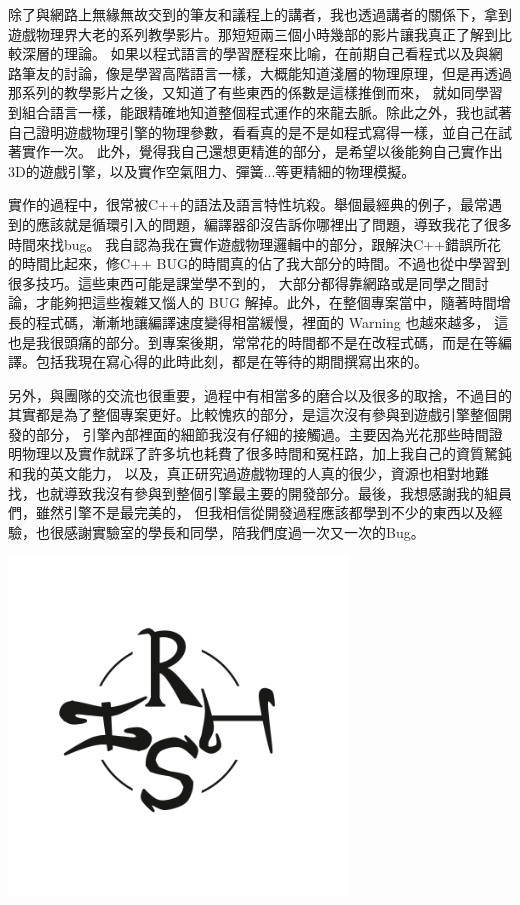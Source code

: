 除了與網路上無緣無故交到的筆友和議程上的講者，我也透過講者的關係下，拿到遊戲物理界大老的系列教學影片。那短短兩三個小時幾部的影片讓我真正了解到比較深層的理論。
如果以程式語言的學習歷程來比喻，在前期自己看程式以及與網路筆友的討論，像是學習高階語言一樣，大概能知道淺層的物理原理，但是再透過那系列的教學影片之後，又知道了有些東西的係數是這樣推倒而來，
就如同學習到組合語言一樣，能跟精確地知道整個程式運作的來龍去脈。除此之外，我也試著自己證明遊戲物理引擎的物理參數，看看真的是不是如程式寫得一樣，並自己在試著實作一次。
此外，覺得我自己還想更精進的部分，是希望以後能夠自己實作出3D的遊戲引擎，以及實作空氣阻力、彈簧...等更精細的物理模擬。

實作的過程中，很常被C++的語法及語言特性坑殺。舉個最經典的例子，最常遇到的應該就是循環引入的問題，編譯器卻沒告訴你哪裡出了問題，導致我花了很多時間來找bug。
我自認為我在實作遊戲物理邏輯中的部分，跟解決C++錯誤所花的時間比起來，修C++ BUG的時間真的佔了我大部分的時間。不過也從中學習到很多技巧。這些東西可能是課堂學不到的，
大部分都得靠網路或是同學之間討論，才能夠把這些複雜又惱人的 BUG 解掉。此外，在整個專案當中，隨著時間增長的程式碼，漸漸地讓編譯速度變得相當緩慢，裡面的 Warning 也越來越多，
這也是我很頭痛的部分。到專案後期，常常花的時間都不是在改程式碼，而是在等編譯。包括我現在寫心得的此時此刻，都是在等待的期間撰寫出來的。

另外，與團隊的交流也很重要，過程中有相當多的磨合以及很多的取捨，不過目的其實都是為了整個專案更好。比較愧疚的部分，是這次沒有參與到遊戲引擎整個開發的部分，
引擎內部裡面的細節我沒有仔細的接觸過。主要因為光花那些時間證明物理以及實作就踩了許多坑也耗費了很多時間和冤枉路，加上我自己的資質駑鈍和我的英文能力，
以及，真正研究過遊戲物理的人真的很少，資源也相對地難找，也就導致我沒有參與到整個引擎最主要的開發部分。最後，我想感謝我的組員們，雖然引擎不是最完美的，
但我相信從開發過程應該都學到不少的東西以及經驗，也很感謝實驗室的學長和同學，陪我們度過一次又一次的Bug。

\begin{center}
\includegraphics[height=9cm]{./resources/rish_2.png}
\end{center}

\newpage